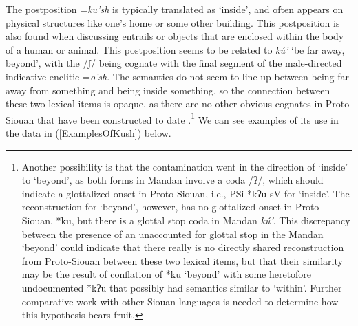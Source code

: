 The postposition =\textit{ku'sh} is typically translated as `inside', and often appears on physical structures like one's home or some other building. This postposition is also found when discussing entrails or objects that are enclosed within the body of a human or animal. This postposition seems to be related to \textit{kú'} `be far away, beyond', with the /ʃ/ being cognate with the final segment of the male-directed indicative enclitic =\textit{o'sh}. The semantics do not seem to line up between being far away from something and being inside something, so the connection between these two lexical items is opaque, as there are no other obvious cognates in Proto-Siouan that have been constructed to date \citet{rankin2015}.\footnote{Another possibility is that the contamination went in the direction of `inside' to `beyond', as both forms in Mandan involve a coda /ʔ/, which should indicate a glottalized onset in Proto-Siouan, i.e., PSi *kʔu-sV for `inside'. The reconstruction for `beyond', however, has no glottalized onset in Proto-Siouan, *ku, but there is a glottal stop coda in Mandan \textit{kú'}. This discrepancy between the presence of an unaccounted for glottal stop in the Mandan `beyond' could indicate that there really is no directly shared reconstruction from Proto-Siouan between these two lexical items, but that their similarity may be the result of conflation of *ku `beyond' with some heretofore undocumented *kʔu that possibly had semantics similar to `within'. Further comparative work with other Siouan languages is needed to determine how this hypothesis bears fruit.}  We can see examples of its use in the data in (\ref{ExamplesOfKush}) below.

